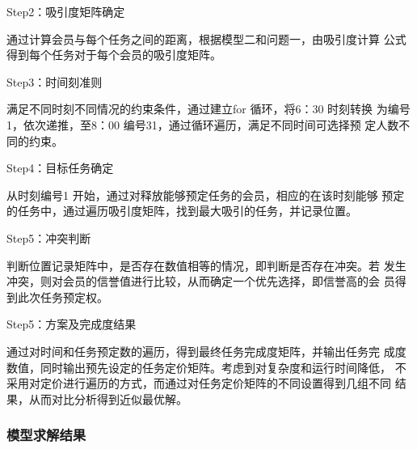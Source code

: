 Step2：吸引度矩阵确定

通过计算会员与每个任务之间的距离，根据模型二和问题一，由吸引度计算
公式得到每个任务对于每个会员的吸引度矩阵。

Step3：时间刻准则

满足不同时刻不同情况的约束条件，通过建立for 循环，将6：30 时刻转换
为编号1，依次递推，至8：00 编号31，通过循环遍历，满足不同时间可选择预
定人数不同的约束。

Step4：目标任务确定

从时刻编号1 开始，通过对释放能够预定任务的会员，相应的在该时刻能够
预定的任务中，通过遍历吸引度矩阵，找到最大吸引的任务，并记录位置。

Step5：冲突判断

判断位置记录矩阵中，是否存在数值相等的情况，即判断是否存在冲突。若
发生冲突，则对会员的信誉值进行比较，从而确定一个优先选择，即信誉高的会
员得到此次任务预定权。

Step5：方案及完成度结果

通过对时间和任务预定数的遍历，得到最终任务完成度矩阵，并输出任务完
成度数值，同时输出预先设定的任务定价矩阵。考虑到对复杂度和运行时间降低，
不采用对定价进行遍历的方式，而通过对任务定价矩阵的不同设置得到几组不同
结果，从而对比分析得到近似最优解。

\subsubsection{模型求解结果}

